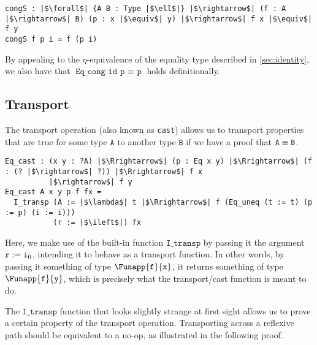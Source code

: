 \documentclass[12pt,twoside,maitrise]{dms}
\theoremstyle{definition}
\numberwithin{equation}{section}
\numberwithin{table}{chapter}
\numberwithin{figure}{chapter}
\newcommand\id[1] {\texttt{#1}}
\newcommand\fn[1] {\texttt{#1}}
\begin{document}
\begin{verbatim}
congS : |$\forall$| {A B : Type |$\ell$|} |$\rightarrow$| (f : A |$\rightarrow$| B) (p : x |$\equiv$| y) |$\rightarrow$| f x |$\equiv$| f y
congS f p i = f (p i)
\end{verbatim}

By appealing to the $\eta$-equivalence of the equality type described in
\autoref{sec:identity}, we also have that $\fn{Eq\_cong id p $\equiv$ p}$ holds
definitionally.

\subsection*{Transport}
The transport operation (also known as {\id{cast}}) allows us to transport
properties that are true for some type $\id{A}$ to another type $\id{B}$ if we
have a proof that $\eqtype{\id{A}}{\id{B}}$.


\begin{verbatim}
Eq_cast : (x y : ?A) |$\Rrightarrow$| (p : Eq x y) |$\Rrightarrow$| (f : (? |$\rightarrow$| ?)) |$\Rrightarrow$| f x
          |$\rightarrow$| f y
Eq_cast A x y p f fx =
  I_transp (A := |$\lambda$| t |$\Rrightarrow$| f (Eq_uneq (t := t) (p := p) (i := i)))
           (r := |$\ileft$|) fx
\end{verbatim}

Here, we make use of the built-in function $\id{I\_transp}$ by passing it the
argument $\earg{\id{r}}{\ileft}$, intending it to behave as a transport
function. In other words, by passing it something of type
$\Funapp{\id{f}}{\id{x}}$, it returns something of type
$\Funapp{\id{f}}{\id{y}}$, which is precisely what the transport/cast function
is meant to do.

The $\id{I\_transp}$ function that looks slightly strange at first sight allows
us to prove a certain property of the transport operation. Transporting across a
reflexive path should be equivalent to a no-op, as illustrated in the
following proof.
\end{document}
